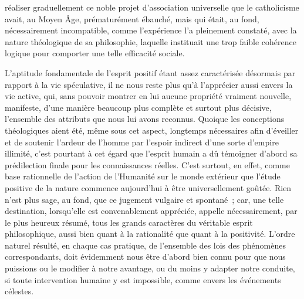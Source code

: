\documentclass[french,twoside]{book} %
\begin{document}
réaliser graduellement ce noble projet d’association universelle que le catholicisme avait, au Moyen Âge, prématurément ébauché, mais qui était, au fond, nécessairement incompatible, comme l’expérience l’a pleinement constaté, avec la nature théologique de sa philosophie, laquelle instituait une trop faible cohérence logique pour comporter une telle efficacité sociale.\par
L’aptitude fondamentale de l’esprit positif étant assez caractérisée désormais par rapport à la vie spéculative, il ne nous reste plus qu’à l’apprécier aussi envers la vie active, qui, sans pouvoir montrer en lui aucune propriété vraiment nouvelle, manifeste, d’une manière beaucoup plus complète et surtout plus décisive, l’ensemble des attributs que nous lui avons reconnus. Quoique les conceptions théologiques aient été, même sous cet aspect, longtemps nécessaires afin d’éveiller et de soutenir l’ardeur de l’homme par l’espoir indirect d’une sorte d’empire illimité, c’est pourtant à cet égard que l’esprit humain a dû témoigner d’abord sa prédilection finale pour les connaissances réelles. C’est surtout, en effet, comme base rationnelle de l’action de l’Humanité sur le monde extérieur que l’étude positive de la nature commence aujourd’hui à être universellement goûtée. Rien n’est plus sage, au fond, que ce jugement vulgaire et spontané ; car, une telle destination, lorsqu’elle est convenablement appréciée, appelle nécessairement, par le plus heureux résumé, tous les grands caractères du véritable esprit philosophique, aussi bien quant à la rationalité que quant à la positivité. L’ordre naturel résulté, en chaque cas pratique, de l’ensemble des lois des phénomènes correspondants, doit évidemment nous être d’abord bien connu pour que nous puissions ou le modifier à notre avantage, ou du moins y adapter notre conduite, si toute intervention humaine y est impossible, comme envers les événements célestes.\par
\end{document}
